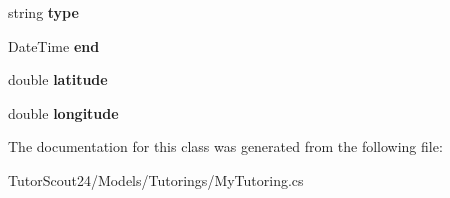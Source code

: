 \begin{DoxyCompactItemize}
\item 
\mbox{\label{class_tutor_scout24_1_1_models_1_1_tutorings_1_1_my_tutoring_a6ff58ccc086e0ed7b6fd2c5b4c1833a2}} 
string {\bfseries type}
\item 
\mbox{\label{class_tutor_scout24_1_1_models_1_1_tutorings_1_1_my_tutoring_aad6d21016152f8f96afedfdbf4d7109b}} 
Date\+Time {\bfseries end}
\item 
\mbox{\label{class_tutor_scout24_1_1_models_1_1_tutorings_1_1_my_tutoring_a4e58e7b750aa0c52b27d158fd54591a7}} 
double {\bfseries latitude}
\item 
\mbox{\label{class_tutor_scout24_1_1_models_1_1_tutorings_1_1_my_tutoring_ae5c754080c75cd0c30555b2a21a68e2b}} 
double {\bfseries longitude}
\end{DoxyCompactItemize}


The documentation for this class was generated from the following file\+:\begin{DoxyCompactItemize}
\item 
Tutor\+Scout24/\+Models/\+Tutorings/My\+Tutoring.\+cs\end{DoxyCompactItemize}
